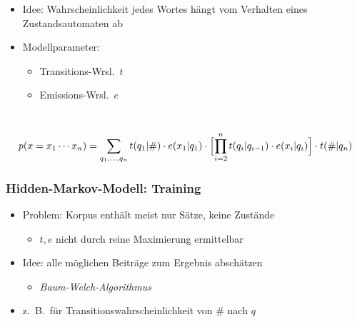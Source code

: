 \documentclass{beamer}
\begin{document}
\begin{frame}
\begin{columns}
  \begin{itemize}
   \item Idee: Wahrscheinlichkeit jedes Wortes hängt vom Verhalten eines Zustandsautomaten ab
   \pause\pause
   \item Modellparameter:
    \begin{itemize}
     \item Transitions-Wrsl.~$t$
     \item Emissions-Wrsl.~$e$
    \end{itemize}
  \end{itemize}
 \end{columns}
 \scriptsize\vspace{1em}\[
  p(x=x_1\cdots x_n) = \sum_{q_1,\ldots,q_n} t(q_1|\#) \cdot e(x_1|q_1) \cdot \Bigl[\prod_{i=2}^n t(q_i|q_{i-1}) \cdot e(x_i|q_i)\Bigr] \cdot t(\#|q_n)
 \]
\end{frame}

\begin{frame}\frametitle{Hidden-Markov-Modell: Training}
 \begin{itemize}
  \item Problem: Korpus enthält meist nur Sätze, keine Zustände
   \begin{itemize}
    \item $t,e$ nicht durch reine Maximierung ermittelbar
   \end{itemize}
  \pause\item Idee: alle möglichen Beiträge zum Ergebnis abschätzen
   \begin{itemize}
    \item \emph{Baum-Welch-Algorithmus}
   \end{itemize}
  \pause\item z.~B.~für Transitionswahrscheinlichkeit von $\#$ nach $q$
   \begin{center}\end{center}
 \end{itemize}
\end{frame}
\end{document}
